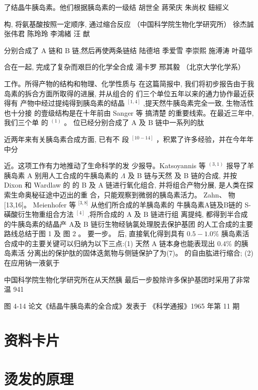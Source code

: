 \documentclass[10pt]{article}
\begin{document}
了结晶牛胰岛素。他们根据胰岛素的一级结 胡世全 蔣荣庆 朱尚权 鈕經义

构, 将氨基酸按照一定顺序, 通过缩合反应 （中国科学院生物化学研究所） 徐杰誠 张伟君 陈玲玲 李鴻緒 汪 猷

分别合成了 \(\mathrm{A}\) 链和 \(\mathrm{B}\) 链,然后再使两条链结 陆德培 季爱雪 李崇熙 施溥涛 叶蕴华

合在一起, 完成了复杂而艰巨的化学全合成 湯卡罗 邢其毅 （北京大学化学系）

工作。所得产物的结构和物理、化学性质与 在这篇简报中, 我们将初步报告由于我 岛素的拆合方面所取得的进展, 并从组合的 们三个单位五年以来的通力协作最近获得有 产物中经过提纯得到胰岛素的结晶 \({}^{\left\lbrack 1,4\right\rbrack }\) ,提天然牛胰岛素完全一致, 生物活性也十分接 的壹级结构是在十年前由 Sanger 等 搞清楚 的重要线索。在最近三年中, 我们三个单 的 \({}^{\left( 1\right) }\) 。 位已经分别合成了 \(\mathrm{A}\) 及 \(\mathrm{B}\) 链中一系列的肽

近两年来有关胰岛素合成方面, 已有不 段 \({}^{\left\lbrack {10} - {14}\right\rbrack }\) ，积累了许多经验，并在今年年中分

近。这项工作有力地推动了生命科学的发 少报导。Katsoyannis 等 \({}^{\left( 3,1\right) }\) 报导了羊胰岛素 A 别用人工合成的牛胰岛素的 \(\Lambda\) 及 B 链与天然 及 B 链的合成, 并按 Dixon 和 Wardlaw 的 的 B 及 A 链进行氧化组合, 并将组合产物分展, 是人类在探索生命奥秘征途中迈出的重 合，只能观察到微弱的胰岛素活力。 Zahn、 物[13,16]。 Meienhofer 等 \({}^{\lbrack 3,8\rbrack }\) 从他们所合成的羊胰岛素的 牛胰岛素A链及B链的 S-磺酸衍生物重组合方法 \({}^{\left\lbrack 4\right\rbrack }\) ,将所合成的 \(\mathrm{A}\) 及 \(\mathrm{B}\) 链进行组 离提纯, 都得到半合成的牛胰岛素的结晶产 A及 B 链衍生物经钠氯处理脱去保护基团 的人工合成的主要路线总结于图 1 及 图 2 。 要一步。 后, 直接氧化得到具有 \({0.5} - {1.0}\%\) 胰岛素活 合成中的主要关键可以归纳为以下三点:(1) 天然 A 链本身也能表现出 \({0.4}\%\) 的胰岛素活 分离出的保护肽的固体迭氮物与侧链保护了为(7)。 的自由肱进行缩合; (2) 在应用钠一液氨于

中国科学院生物化学研究所在从天然胰 最后一步股除许多保护基团时采用了非常温 941

图 4-14 论文《结晶牛胰岛素的全合成》发表于 《科学通报》1965 年第 11 期

\section*{资料卡片}

\section*{烫发的原理}
\end{document}
